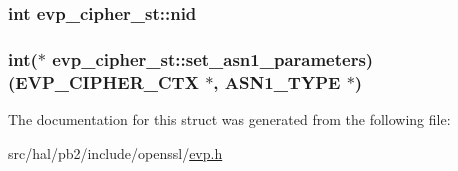 \subsubsection[{\texorpdfstring{nid}{nid}}]{\setlength{\rightskip}{0pt plus 5cm}int evp\+\_\+cipher\+\_\+st\+::nid}\hypertarget{structevp__cipher__st_a3e92a36ebcc6d193fa91f0edf7aa5561}{}\label{structevp__cipher__st_a3e92a36ebcc6d193fa91f0edf7aa5561}
\subsubsection[{\texorpdfstring{set\+\_\+asn1\+\_\+parameters}{set_asn1_parameters}}]{\setlength{\rightskip}{0pt plus 5cm}int($\ast$ evp\+\_\+cipher\+\_\+st\+::set\+\_\+asn1\+\_\+parameters) ({\bf E\+V\+P\+\_\+\+C\+I\+P\+H\+E\+R\+\_\+\+C\+TX} $\ast$, {\bf A\+S\+N1\+\_\+\+T\+Y\+PE} $\ast$)}\hypertarget{structevp__cipher__st_aca59cfca681fefba705b0c58f9956e9b}{}\label{structevp__cipher__st_aca59cfca681fefba705b0c58f9956e9b}


The documentation for this struct was generated from the following file\+:\begin{DoxyCompactItemize}
\item 
src/hal/pb2/include/openssl/\hyperlink{evp_8h}{evp.\+h}\end{DoxyCompactItemize}
